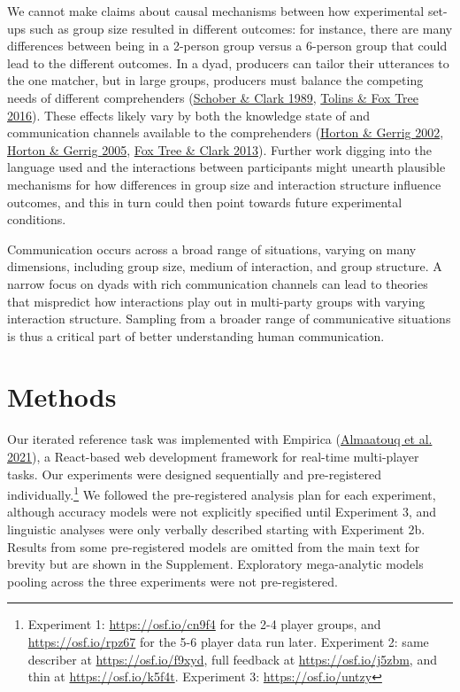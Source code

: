 \documentclass[
  english,
]{article}
\begin{document}
We cannot make claims about causal mechanisms between how experimental set-ups such as group size resulted in different outcomes: for instance, there are many differences between being in a 2-person group versus a 6-person group that could lead to the different outcomes. In a dyad, producers can tailor their utterances to the one matcher, but in large groups, producers must balance the competing needs of different comprehenders (\protect\hyperlink{ref-schober1989}{Schober \& Clark 1989}, \protect\hyperlink{ref-tolins2016}{Tolins \& Fox Tree 2016}). These effects likely vary by both the knowledge state of and communication channels available to the comprehenders (\protect\hyperlink{ref-horton2002}{Horton \& Gerrig 2002}, \protect\hyperlink{ref-horton2005}{Horton \& Gerrig 2005}, \protect\hyperlink{ref-fox-tree2013}{Fox Tree \& Clark 2013}). Further work digging into the language used and the interactions between participants might unearth plausible mechanisms for how differences in group size and interaction structure influence outcomes, and this in turn could then point towards future experimental conditions.

Communication occurs across a broad range of situations, varying on many dimensions, including group size, medium of interaction, and group structure.
A narrow focus on dyads with rich communication channels can lead to theories that mispredict how interactions play out in multi-party groups with varying interaction structure.
Sampling from a broader range of communicative situations is thus a critical part of better understanding human communication.

\hypertarget{methods}{%
\section{Methods}\label{methods}}

Our iterated reference task was implemented with Empirica (\protect\hyperlink{ref-almaatouq2020empirica}{Almaatouq et al. 2021}), a React-based web development framework for real-time multi-player tasks.
Our experiments were designed sequentially and pre-registered individually.\footnote{Experiment 1: \url{https://osf.io/cn9f4} for the 2-4 player groups, and \url{https://osf.io/rpz67} for the 5-6 player data run later. Experiment 2: same describer at \url{https://osf.io/f9xyd}, full feedback at \url{https://osf.io/j5zbm}, and thin at \url{https://osf.io/k5f4t}. Experiment 3: \url{https://osf.io/untzy}}
We followed the pre-registered analysis plan for each experiment, although accuracy models were not explicitly specified until Experiment 3, and linguistic analyses were only verbally described starting with Experiment 2b.
Results from some pre-registered models are omitted from the main text for brevity but are shown in the Supplement.
Exploratory mega-analytic models pooling across the three experiments were not pre-registered.
\end{document}
